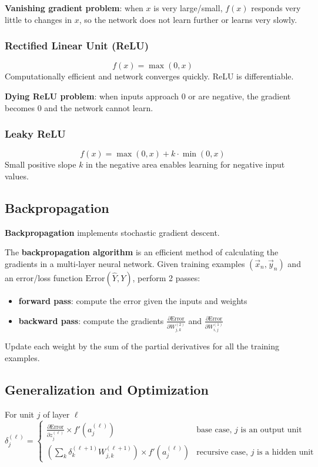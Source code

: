 \documentclass[11pt]{article}
\begin{document}
\textbf{Vanishing gradient problem}: when \(x\) is very large/small, \(f(x)\)
responds very little to changes in \(x\), so the network does not learn
further or learns very slowly.
\subsubsection{Rectified Linear Unit (ReLU)}
\label{sec:org405c1e0}
$$ f(x) = \max (0, x) $$
Computationally efficient and network converges quickly.
ReLU is differentiable.

\textbf{Dying ReLU problem}: when inputs approach 0 or are negative,
the gradient becomes 0 and the network cannot learn.
\subsubsection{Leaky ReLU}
\label{sec:org7d21f3d}
$$ f(x) = \max(0, x) + k \cdot \min(0, x) $$
Small positive slope \(k\) in the negative area enables learning for
negative input values.
\subsection{Backpropagation}
\label{sec:org47c07c3}
\textbf{Backpropagation} implements stochastic gradient descent.

The \textbf{backpropagation algorithm} is an efficient method of calculating the gradients
in a multi-layer neural network.
Given training examples \((\vec{x}_{n}, \vec{y}_{n})\) and an error/loss function
\(\text{Error}(\hat{Y}, Y)\), perform 2 passes:
\begin{itemize}
\item \textbf{forward pass}: compute the error given the inputs and weights
\item \textbf{backward pass}: compute the gradients \(\frac{\partial \text{Error}}{\partial W_{j, k}^{(2)}}\)
and \(\frac{\partial \text{Error}}{\partial W_{i, j}^{(1)}}\)
\end{itemize}

Update each weight by the sum of the partial derivatives for all the training examples.
\subsection{Generalization and Optimization}
\label{sec:orgaa64815}
For unit \(j\) of layer \(\ell\)
$$ \delta_{j}^{(\ell)} = \begin{cases} \frac{\partial \text{Error}}{\partial z_{j}^{(\ell)}} \times f'(a_{j}^{(\ell)}) & \text{base case, $j$ is an output unit} \\ \left( \sum_{k} \delta_{k}^{(\ell + 1)} W_{j, k}^{(\ell + 1)} \right) \times f'(a_{j}^{(\ell)}) & \text{recursive case, $j$ is a hidden unit} \end{cases} $$
\end{document}
